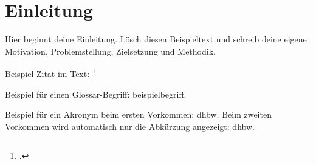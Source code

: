 \chapter{Einleitung}
\label{ch:einleitung}

Hier beginnt deine Einleitung. Lösch diesen Beispieltext und schreib deine eigene Motivation, Problemstellung, Zielsetzung und Methodik.

Beispiel-Zitat im Text: \footcite[Vgl.][S.~42]{mustermann2024}

Beispiel für einen Glossar-Begriff: \gls{beispielbegriff}.

Beispiel für ein Akronym beim ersten Vorkommen: \gls{dhbw}. Beim zweiten Vorkommen wird automatisch nur die Abkürzung angezeigt: \gls{dhbw}.
